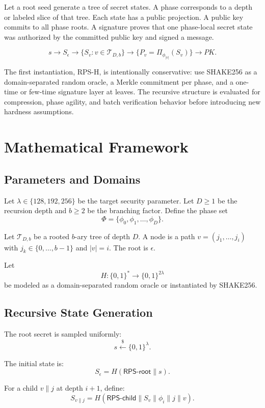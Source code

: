 \documentclass[11pt]{article}
\begin{document}
Let a root seed generate a tree of secret states. A phase corresponds to a depth
or labeled slice of that tree. Each state has a public projection. A public key
commits to all phase roots. A signature proves that one phase-local secret state
was authorized by the committed public key and signed a message.

\[
  s \longrightarrow S_\epsilon
    \longrightarrow \{S_v : v \in \mathcal{T}_{D,b}\}
    \longrightarrow \{P_v = \Pi_{\phi_{|v|}}(S_v)\}
    \longrightarrow PK.
\]

The first instantiation, RPS-H, is intentionally conservative: use SHAKE256 as a
domain-separated random oracle, a Merkle commitment per phase, and a one-time or
few-time signature layer at leaves. The recursive structure is evaluated for
compression, phase agility, and batch verification behavior before introducing
new hardness assumptions.

\section{Mathematical Framework}

\subsection{Parameters and Domains}

Let $\lambda \in \{128,192,256\}$ be the target security parameter. Let
$D \geq 1$ be the recursion depth and $b \geq 2$ be the branching factor. Define
the phase set
\[
  \Phi = \{\phi_0,\phi_1,\ldots,\phi_D\}.
\]

Let $\mathcal{T}_{D,b}$ be a rooted $b$-ary tree of depth $D$. A node is a path
$v=(j_1,\ldots,j_i)$ with $j_k \in \{0,\ldots,b-1\}$ and $|v|=i$. The root is
$\epsilon$.

Let
\[
  H : \{0,1\}^* \rightarrow \{0,1\}^{2\lambda}
\]
be modeled as a domain-separated random oracle or instantiated by SHAKE256.

\subsection{Recursive State Generation}

The root secret is sampled uniformly:
\[
  s \xleftarrow{\$} \{0,1\}^{\lambda}.
\]

The initial state is:
\[
  S_\epsilon = H(\textsf{RPS-root} \parallel s).
\]

For a child $v \parallel j$ at depth $i+1$, define:
\[
  S_{v \parallel j}
    = H(\textsf{RPS-child} \parallel S_v \parallel \phi_i \parallel j \parallel v).
\]
\end{document}
